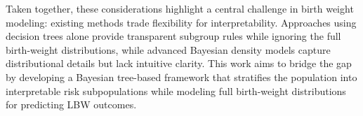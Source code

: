 Taken together, these considerations highlight a central challenge in birth weight modeling: existing methods trade flexibility for interpretability. Approaches using decision trees alone provide transparent subgroup rules while ignoring the full birth-weight distributions, while advanced Bayesian density models capture distributional details but lack intuitive clarity. This work aims to bridge the gap by developing a Bayesian tree-based framework that stratifies the population into interpretable risk subpopulations while modeling full birth-weight distributions for predicting LBW outcomes.
